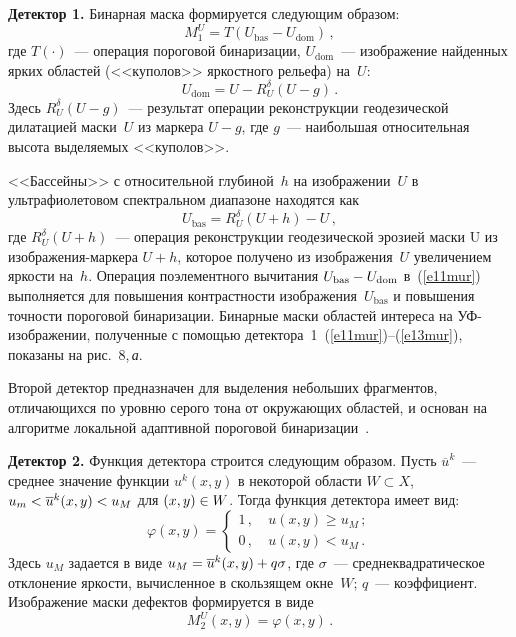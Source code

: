 \begin{multicols}{2}
\smallskip

\noindent
\textbf{Детектор 1.} Бинарная маска формируется сле\-ду\-ющим образом:
\begin{equation}
M_1^U = T\left( U_{\mathrm{bas}}-U_{\mathrm{dom}}\right)\,,
\label{e11mur}
\end{equation}
где $T(\cdot)$~--- операция пороговой бинаризации, $U_{\mathrm{dom}}$~--- изображение найденных 
ярких областей (<<куполов>> яркостного рельефа) на~$U$:
\begin{equation}
U_{\mathrm{dom}} =U-R_U^\delta \left( U-g\right)\,.
\label{e12mur}
\end{equation}
Здесь $R_U^\delta\left(U-g\right)$~--- результат операции реконструкции геодезической 
дилатацией маски~$U$ из маркера $U-g$, где $g$~--- наибольшая относительная высота 
выделяемых <<куполов>>.
  
  <<Бассейны>> с относительной глубиной~$h$ на изоб\-ра\-же\-нии~$U$ в ультрафиолетовом 
спектральном диапазоне находятся как
  \begin{equation}
  U_{\mathrm{bas}} =R_U^\delta \left(U+h\right) -U\,,
  \label{e13mur}
  \end{equation}
где $ R_U^\delta \left(U+h\right)$~--- операция реконструкции геодезической эрозией маски U 
из изображения-маркера $U+h$, которое получено из изображения~$U$ увеличением 
яркости на~$h$. Операция поэлементного вычитания $U_{\mathrm{bas}}\hm-U_{\mathrm{dom}}$ 
в~(\ref{e11mur}) выполняется для повышения контрастности изображения~$U_{\mathrm{bas}}$ и 
повышения точности пороговой бинаризации. Бинарные маски областей интереса на 
УФ-изоб\-ра\-же\-нии, полученные с помощью детектора~1~(\ref{e11mur})--(\ref{e13mur}), 
показаны на рис.~8,\,\textit{а}.

  Второй детектор предназначен для выделения небольших фрагментов, отличающихся по 
уровню серого тона от окружающих областей, и основан на алгоритме локальной адаптивной 
пороговой бинаризации~\cite{17mur}.

\smallskip

\noindent
\textbf{Детектор 2.} Функция детектора строится сле\-ду\-ющим образом. Пусть 
$\overline{u}^k$~--- среднее значение функции $u^k(x,y)$ в некоторой области $W\subset X$, 
$u_m\hm< \overline{u}^k(x,y)\hm < u_M$ для $(x,y)\hm\in W$. Тогда функция детектора 
имеет вид:
\begin{equation}
\varphi(x,y) =\begin{cases}
1\,, & \ u(x,y)\geq u_M\,;\\
0\,, & \ u(x,y)<u_M\,.
\end{cases}
\label{e14mur}
\end{equation}
Здесь $u_M$ задается в виде $u_M\hm=\overline{u}^k(x,y)+q\sigma$, где $\sigma$~--- 
среднеквадратическое отклонение яркости, вы\-чис\-лен\-ное в скользящем окне~$W$; $q$~--- 
коэффициент. Изображение маски дефектов формируется в виде 
\begin{equation}
M_2^U(x,y)=\varphi(x,y)\,.
\label{e15mur}
\end{equation}
  

\end{multicols}
